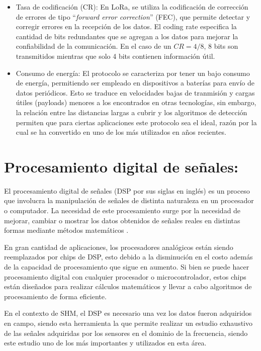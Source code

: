 \begin{itemize}
    \item Tasa de codificación (CR): En LoRa, se utiliza la codificación de corrección de errores de tipo ``\textit{forward error correction}'' (FEC), que permite detectar y corregir errores en la recepción de los datos. El coding rate especifica la cantidad de bits redundantes que se agregan a los datos para mejorar la confiabilidad de la comunicación. En el caso de un $CR = 4 / 8$, 8 bits son transmitidos mientras que solo 4 bits contienen información útil.
    
    
    \item Consumo de energía: El protocolo se caracteriza por tener un bajo consumo de energía, permitiendo ser empleado en dispositivos a baterías para envío de datos periódicos. Esto se traduce en velocidades bajas de tranmisión y cargas útiles (payloads) menores a los encontrados en otras tecnologías, sin embargo, la relación entre las distancias largas a cubrir y los algoritmos de detección permiten que para ciertas aplicaciones este protocolo sea el ideal, razón por la cual se ha convertido en uno de los más utilizados en años recientes.
\end{itemize}

\section{Procesamiento digital de señales:}

El procesamiento digital de señales (DSP por sus siglas en inglés) es un proceso que involucra la manipulación de señales de distinta naturaleza en un procesador o computador. La necesidad de este procesamiento surge por la necesidad de mejorar, cambiar o mostrar los datos obtenidos de señales reales en distintas formas mediante métodos matemáticos \citep{proakisDSP}.

En gran cantidad de aplicaciones, los procesadores analógicos están siendo reemplazados por chips de DSP, esto debido a la disminución en el costo además de la capacidad de procesamiento que sigue en aumento. Si bien se puede hacer procesamiento digital con cualquier procesador o microcontrolador, estos chips están diseñados para realizar cálculos matemáticos y llevar a cabo algoritmos de procesamiento de forma eficiente. 

En el contexto de SHM, el DSP es necesario una vez los datos fueron adquiridos en campo, siendo esta herramienta la que permite realizar un estudio exhaustivo de las señales adquiridas por los sensores en el dominio de la frecuencia, siendo este estudio uno de los más importantes y utilizados en esta área.

